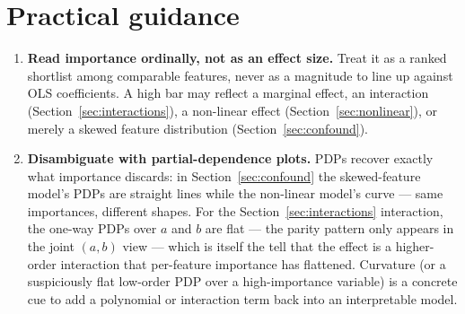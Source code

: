 \section{Practical guidance}

\begin{enumerate}[leftmargin=1.6em]
\item \textbf{Read importance ordinally, not as an effect size.} Treat it as a
  ranked shortlist among comparable features, never as a magnitude to line up
  against OLS coefficients. A high bar may reflect a marginal effect, an
  interaction (Section~\ref{sec:interactions}), a non-linear effect
  (Section~\ref{sec:nonlinear}), or merely a skewed feature distribution
  (Section~\ref{sec:confound}).
\item \textbf{Disambiguate with partial-dependence plots.} PDPs \citep{friedman2001}
  recover exactly what importance discards: in Section~\ref{sec:confound} the skewed-feature
  model's PDPs are straight lines while the non-linear model's curve --- same
  importances, different shapes. For the Section~\ref{sec:interactions}
  interaction, the one-way PDPs over $a$ and $b$ are flat --- the parity pattern
  only appears in the joint $(a,b)$ view --- which is itself the tell that the
  effect is a higher-order interaction that per-feature importance has flattened.
  Curvature (or a suspiciously flat low-order PDP over a high-importance variable)
  is a concrete cue to add a polynomial or interaction term back into an
  interpretable model.


\end{enumerate}
